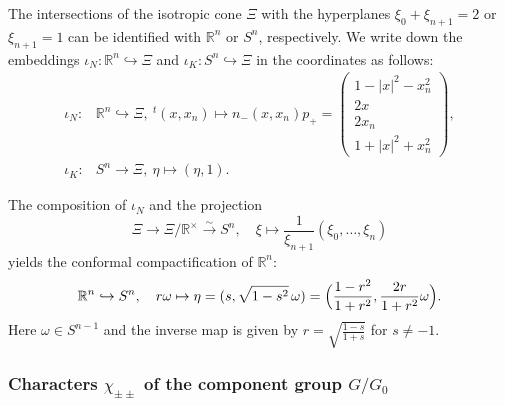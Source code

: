 The intersections
 of the isotropic cone $\Xi$
 with the hyperplanes
 $\xi_0 + \xi_{n+1}=2$
 or $\xi_{n+1}=1$
 can be identified with ${\mathbb{R}}^n$ or $S^n$, 
 respectively.  
We write down the embeddings
 $\iota_N:{\mathbb{R}}^n \hookrightarrow \Xi$
 and $\iota_K:S^n \hookrightarrow \Xi$
 in the coordinates as follows:
\begin{align}
\label{eqn:NXi}
\iota_N:&
\mathbb{R}^n \hookrightarrow \Xi,
\
{}^t(x,x_n) \mapsto 
{n_-} (x,x_n) p_+
   = \left(\begin{array}{l}
           1 - |x|^2 - x_n^2  \\
           2x                     \\
           2x_n                  \\
           1 + |x|^2 + x_n^2
     \end{array}\right), 
\\
\label{eqn:KXi}
\iota_K\colon&
S^n \to \Xi, 
\
\eta \mapsto (\eta,1).  
\end{align}

The composition
 of $\iota_N$ and the projection
\begin{equation*}
   \Xi \to \Xi/\mathbb{R}^\times \overset{\sim}{\to} S^n,
\quad
\xi \mapsto \frac{1}{\xi_{n+1}} (\xi_0,\dots,\xi_n)
\end{equation*}
yields the conformal compactification of ${\mathbb{R}}^n$:
\begin{equation}
\label{eqn:XiSn}
\mathbb{R}^n \hookrightarrow S^n,
\quad
r \omega \mapsto \eta = (s, \sqrt{1-s^2} \, \omega ) 
= \Bigl( \frac{1-r^2}{1+r^2}, \frac{2r}{1+r^2} \omega \Bigr).  
\end{equation}
Here $\omega \in S^{n-1}$
 and the inverse map is given by 
$
r = \sqrt{\frac{1-s}{1+s}}
$
 for $s \ne -1$.  





\subsubsection{Characters $\chi_{\pm\pm}$ of the component group $G/G_0$}
\label{subsec:chcomp}

